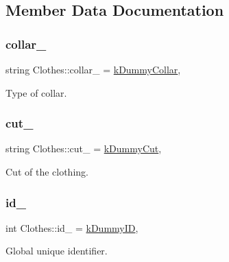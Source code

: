 \subsection{Member Data Documentation}
\mbox{\label{classClothes_ae2e5026257b3a2f2ddbf61757fd3b57b}} 
\subsubsection{\texorpdfstring{collar\+\_\+}{collar\_}}
{\footnotesize\ttfamily string Clothes\+::collar\+\_\+ = \mbox{\hyperlink{clothes_8h_ac06c9f556f68bcd2829e36c55b70a86e}{k\+Dummy\+Collar}}\hspace{0.3cm}{\ttfamily [protected]}, {\ttfamily [inherited]}}



Type of collar. 

\mbox{\label{classClothes_ac1c2286c8928a5eee91d818a098a44ac}} 
\subsubsection{\texorpdfstring{cut\+\_\+}{cut\_}}
{\footnotesize\ttfamily string Clothes\+::cut\+\_\+ = \mbox{\hyperlink{clothes_8h_a8a6eb066049b009439505355aeaae375}{k\+Dummy\+Cut}}\hspace{0.3cm}{\ttfamily [protected]}, {\ttfamily [inherited]}}



Cut of the clothing. 

\mbox{\label{classClothes_a8978d931db5ca47c3ccea30def4ae83e}} 
\subsubsection{\texorpdfstring{id\+\_\+}{id\_}}
{\footnotesize\ttfamily int Clothes\+::id\+\_\+ = \mbox{\hyperlink{clothes_8h_a77186917343a417a2369cdff0bc86d31}{k\+Dummy\+ID}}\hspace{0.3cm}{\ttfamily [protected]}, {\ttfamily [inherited]}}



Global unique identifier. 

